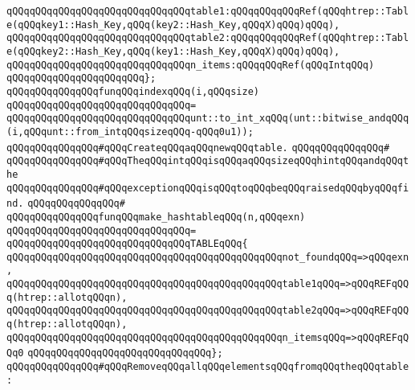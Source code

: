 \verb|qQQqqQQqqQQqqQQqqQQqqQQqqQQqqQQqtable1:qQQqqQQqqQQqRef(qQQqhtrep::Table(qQQqkey1::Hash_Key,qQQq(key2::Hash_Key,qQQqX)qQQq)qQQq),|\newline
\verb|qQQqqQQqqQQqqQQqqQQqqQQqqQQqqQQqtable2:qQQqqQQqqQQqRef(qQQqhtrep::Table(qQQqkey2::Hash_Key,qQQq(key1::Hash_Key,qQQqX)qQQq)qQQq),|\newline
\verb|qQQqqQQqqQQqqQQqqQQqqQQqqQQqqQQqn_items:qQQqqQQqRef(qQQqIntqQQq)|\newline
\verb|qQQqqQQqqQQqqQQqqQQqqQQq};|\newline
\newline
\verb|qQQqqQQqqQQqqQQqfunqQQqindexqQQq(i,qQQqsize)|\newline
\verb|qQQqqQQqqQQqqQQqqQQqqQQqqQQqqQQq=|\newline
\verb|qQQqqQQqqQQqqQQqqQQqqQQqqQQqqQQqunt::to_int_xqQQq(unt::bitwise_andqQQq(i,qQQqunt::from_intqQQqsizeqQQq-qQQq0u1));|\newline
\newline
\verb|qQQqqQQqqQQqqQQq#qQQqCreateqQQqaqQQqnewqQQqtable.|\newline
\verb|qQQqqQQqqQQqqQQq#|\newline
\verb|qQQqqQQqqQQqqQQq#qQQqTheqQQqintqQQqisqQQqaqQQqsizeqQQqhintqQQqandqQQqthe|\newline
\verb|qQQqqQQqqQQqqQQq#qQQqexceptionqQQqisqQQqtoqQQqbeqQQqraisedqQQqbyqQQqfind.|\newline
\verb|qQQqqQQqqQQqqQQq#|\newline
\verb|qQQqqQQqqQQqqQQqfunqQQqmake_hashtableqQQq(n,qQQqexn)|\newline
\verb|qQQqqQQqqQQqqQQqqQQqqQQqqQQqqQQq=|\newline
\verb|qQQqqQQqqQQqqQQqqQQqqQQqqQQqqQQqTABLEqQQq{|\newline
\verb|qQQqqQQqqQQqqQQqqQQqqQQqqQQqqQQqqQQqqQQqqQQqqQQqnot_foundqQQq=>qQQqexn,|\newline
\verb|qQQqqQQqqQQqqQQqqQQqqQQqqQQqqQQqqQQqqQQqqQQqqQQqtable1qQQq=>qQQqREFqQQq(htrep::allotqQQqn),|\newline
\verb|qQQqqQQqqQQqqQQqqQQqqQQqqQQqqQQqqQQqqQQqqQQqqQQqtable2qQQq=>qQQqREFqQQq(htrep::allotqQQqn),|\newline
\verb|qQQqqQQqqQQqqQQqqQQqqQQqqQQqqQQqqQQqqQQqqQQqqQQqn_itemsqQQq=>qQQqREFqQQq0|\newline
\verb|qQQqqQQqqQQqqQQqqQQqqQQqqQQqqQQq};|\newline
\newline
\verb|qQQqqQQqqQQqqQQq#qQQqRemoveqQQqallqQQqelementsqQQqfromqQQqtheqQQqtable:|\newline
